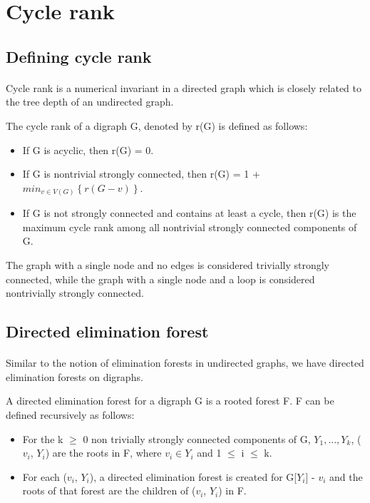\section{Cycle rank}

\subsection{Defining cycle rank}

\paragraph{}
Cycle rank is a numerical invariant in a directed graph which is closely related to the tree depth of an undirected graph.
\begin{definition}
The cycle rank of a digraph G, denoted by r(G) is defined as follows:

\begin{itemize} 
\item If G is acyclic, then r(G) = 0.
\item If G is nontrivial strongly connected, then r(G) = 1 + $min_{v \in V(G)} \left\{r(G-v)\right\}$.
\item If G is not strongly connected and contains at least a cycle, then r(G) is the maximum cycle rank among all nontrivial strongly connected components of G.
\end{itemize}

The graph with a single node and no edges is considered trivially strongly connected, while the graph with a single node and a loop is considered nontrivially strongly connected.

\end{definition}

\subsection{Directed elimination forest}

\paragraph{}
Similar to the notion of elimination forests in undirected graphs, we have directed elimination forests on digraphs.

\begin{definition}

A directed elimination forest for a digraph G is a rooted forest F. F can be defined recursively as follows:

\begin{itemize}
\item For the k $\geq$ 0 non trivially strongly connected components of G, $Y_1, \ldots, Y_k$, ($v_i$, $Y_i$) are the roots in F, where $v_i \in Y_i$ and 1 $\leq$ i $\leq$ k.
\item For each ($v_i$, $Y_i$), a directed elimination forest is created for G[$Y_i$] - $v_i$ and the roots of that forest are the children of ($v_i$, $Y_i$) in F.
\end{itemize}
\label{definition:DET}
\end{definition}

